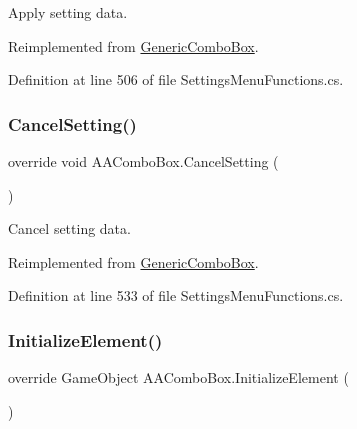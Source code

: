 Apply setting data. 



Reimplemented from \hyperlink{class_generic_combo_box_a5aced71f035bd463a4ebaaffe19ec547}{Generic\+Combo\+Box}.



Definition at line 506 of file Settings\+Menu\+Functions.\+cs.

\mbox{\label{class_a_a_combo_box_a1886a8ebd7ed57a6a5739469c6a88f65}} 
\subsubsection{\texorpdfstring{Cancel\+Setting()}{CancelSetting()}}
{\footnotesize\ttfamily override void A\+A\+Combo\+Box.\+Cancel\+Setting (\begin{DoxyParamCaption}{ }\end{DoxyParamCaption})\hspace{0.3cm}{\ttfamily [virtual]}}



Cancel setting data. 



Reimplemented from \hyperlink{class_generic_combo_box_a0949a84cf1e33d13346cb90597e005ce}{Generic\+Combo\+Box}.



Definition at line 533 of file Settings\+Menu\+Functions.\+cs.

\mbox{\label{class_a_a_combo_box_a24e6de36b3019dd2a428837d6fab86b8}} 
\subsubsection{\texorpdfstring{Initialize\+Element()}{InitializeElement()}}
{\footnotesize\ttfamily override Game\+Object A\+A\+Combo\+Box.\+Initialize\+Element (\begin{DoxyParamCaption}{ }\end{DoxyParamCaption})\hspace{0.3cm}{\ttfamily [virtual]}}



